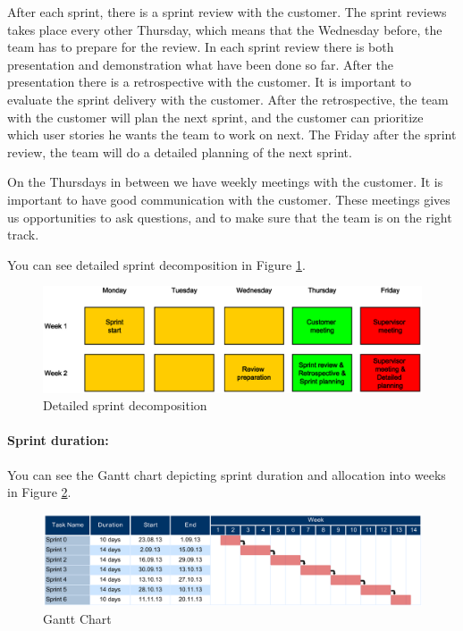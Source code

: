After each sprint, there is a sprint review with the customer. The sprint reviews takes place every other Thursday, which means that the Wednesday before, the team has to prepare for the review. In each sprint review there is both presentation and demonstration what have been done so far. After the presentation there is a retrospective with the customer. 
It is important to evaluate the sprint delivery with the customer. 
After the retrospective, the team with the customer will plan the next sprint, and the customer can prioritize which user stories he wants the team to work on next. 
The Friday after the sprint review, the team will do a detailed planning of the next sprint.

On the Thursdays in between we have weekly meetings with the customer. It is important to have good communication with the customer. These meetings gives us opportunities to ask questions, and to make sure that the team is on the right track.

You can see detailed sprint decomposition in Figure \ref{img:sprint_detail}.
\begin{figure}[h!]
    \begin{center}
    \includegraphics[scale=0.5]{images/sprint_detail.eps}
    \caption{Detailed sprint decomposition}
    \label{img:sprint_detail}
    \end{center}
\end{figure}


\paragraph{Sprint duration:}

You can see the Gantt chart depicting sprint duration and allocation into weeks in Figure \ref{fig:gantt}.
\begin{figure}[!h]
	\centering
		\includegraphics[width=18cm, angle=90]{planning/gantt.pdf}
	\caption{Gantt Chart}
	\label{fig:gantt}
\end{figure}

